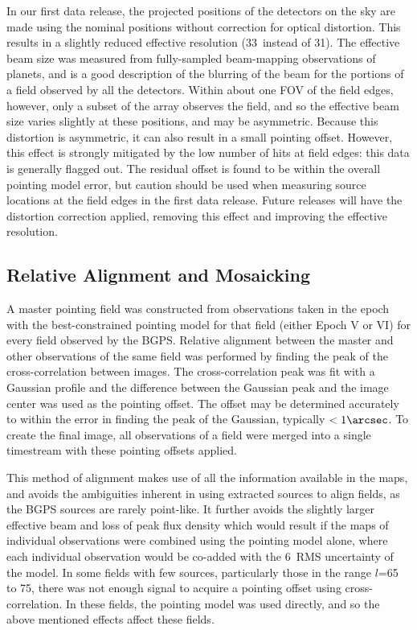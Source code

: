 \documentclass[12pt,preprint]{aastex}
\newcommand{\lon}{\ensuremath{l}}
\def\bgps{BGPS}
\newcommand{\bcamfwhm}{31\arcsec}
\newcommand{\bcamfwhmeff}{33\arcsec}
\begin{document}
In our first data release, the projected positions of the detectors on
the sky are made using the nominal positions without correction for
optical distortion.  This results in a slightly reduced effective
resolution (\bcamfwhmeff\ instead of \bcamfwhm).  The effective beam
size was measured from fully-sampled beam-mapping observations of
planets, and is a good description of the blurring of the beam for the
portions of a field observed by all the detectors.  Within about one
FOV of the field edges, however, only a subset of the array observes
the field, and so the effective beam size varies slightly at these
positions, and may be asymmetric.  Because this distortion is
asymmetric, it can also result in a small pointing offset.  However,
this effect is strongly mitigated by the low number of hits at field
edges: this data is generally flagged out.  The residual offset is
found to be within the overall pointing model error, but caution
should be used when measuring source locations at the field edges in
the first data release.  Future releases will have the distortion
correction applied, removing this effect and improving the effective
resolution.

\subsection{Relative Alignment and Mosaicking}

A master pointing field was constructed from observations taken in the
epoch with the best-constrained pointing model for that field (either
Epoch V or VI) for every field observed by the \bgps.  Relative
alignment between the master and other observations of the same field
was performed by finding the peak of the cross-correlation between
images. The cross-correlation peak was fit with a Gaussian profile and
the difference between the Gaussian peak and the image center was used
as the pointing offset.  The offset may be determined accurately to
within the error in finding the peak of the Gaussian, typically
$<1\arcsec$.  To create the final image, all observations of a field
were merged into a single timestream with these pointing offsets
applied.

This method of alignment makes use of all the information available in
the maps, and avoids the ambiguities inherent in using extracted
sources to align fields, as the BGPS sources are rarely point-like.
It further avoids the slightly larger effective beam and loss of peak
flux density which would result if the maps of individual observations
were combined using the pointing model alone, where each individual
observation would be co-added with the 6\arcsec\ RMS uncertainty of
the model.  In some fields with few sources, particularly those in the
range \lon=65 to 75, there was not enough signal to acquire a pointing
offset using cross-correlation.  In these fields, the pointing model
was used directly, and so the above mentioned effects affect these
fields.
\end{document}
